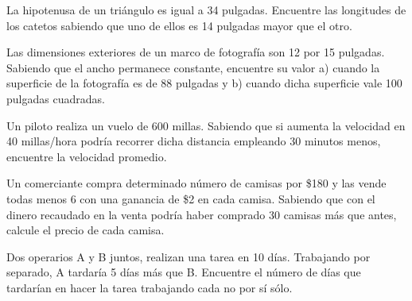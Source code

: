 	\begin{problema}
		\label{bron:exmp:16.24}
		La hipotenusa de un triángulo es igual a 34 pulgadas. Encuentre las longitudes de los catetos sabiendo que uno de ellos es 14 pulgadas mayor que el otro.
	\end{problema}



	\begin{problema}
		\label{bron:exmp:16.25}
		Las dimensiones exteriores de un marco de fotograf\'ia son 12 por 15 pulgadas. Sabiendo que el ancho permanece constante, encuentre su valor a) cuando la superficie de la fotograf\'ia es de 88 pulgadas y b) cuando dicha superficie vale 100 pulgadas cuadradas. 
	\end{problema}



	\begin{problema}
		\label{bron:exmp:16.26}
		Un piloto realiza un vuelo de 600 millas. Sabiendo que si aumenta la velocidad en 40 millas/hora podr\'ia recorrer dicha distancia empleando 30 minutos menos, encuentre la velocidad promedio.  
	\end{problema}



	\begin{problema}
		\label{bron:exmp:16.27}
		Un comerciante compra determinado número de camisas por \$180 y las vende todas menos 6 con una ganancia de \$2 en cada camisa. Sabiendo que con el dinero recaudado en la venta podr\'ia haber comprado 30 camisas más que antes, calcule el precio de cada camisa.  
	\end{problema}



	\begin{problema}
		\label{bron:exmp:16.28}
		Dos operarios A y B juntos, realizan una tarea en 10 d\'ias. Trabajando por separado, A tardar\'ia 5 d\'ias más que B. Encuentre  el número de d\'ias que tardar\'ian en hacer la tarea trabajando cada no por s\'i s\'olo. 
	\end{problema}

